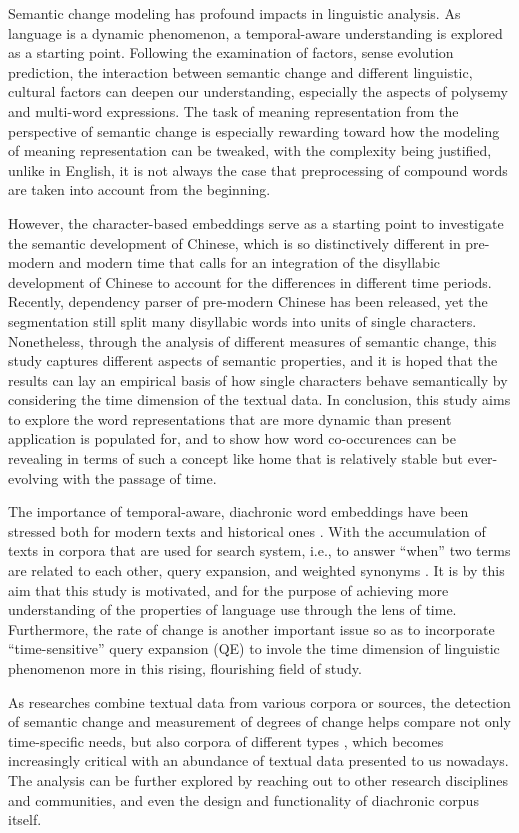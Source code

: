 Semantic change modeling has profound impacts in linguistic analysis. As language is a dynamic phenomenon, a temporal-aware understanding is explored as a starting point. Following the examination of factors, sense evolution prediction, the interaction between semantic change and different linguistic, cultural factors can deepen our understanding, especially the aspects of polysemy and multi-word expressions. The task of meaning representation from the perspective of semantic change is especially rewarding toward how the modeling of meaning representation can be tweaked, with the complexity being justified, unlike in English, it is not always the case that preprocessing of compound words are taken into account from the beginning.

However, the character-based embeddings serve as a starting point to investigate the semantic development of Chinese, which is so distinctively different in pre-modern and modern time that calls for an integration of the disyllabic development of Chinese to account for the differences in different time periods. Recently, dependency parser of pre-modern Chinese has been released, yet the segmentation still split many disyllabic words into units of single characters. Nonetheless, through the analysis of different measures of semantic change, this study captures different aspects of semantic properties, and it is hoped that the results can lay an empirical basis of how single characters behave semantically by considering the time dimension of the textual data. In conclusion, this study aims to explore the word representations that are more dynamic than present application is populated for, and to show how word co-occurences can be revealing in terms of such a concept like home that is relatively stable but ever-evolving with the passage of time.

The importance of temporal-aware, diachronic word embeddings have been stressed both for modern texts and historical ones \parencite{huang2019neural,rosin2017learning,ruder2017word}. With the accumulation of texts in corpora that are used for search system, i.e., to answer ``when'' two terms are related to each other, query expansion, and weighted synonyms \parencite{rosin2017learning}. It is by this aim that this study is motivated, and for the purpose of achieving more understanding of the properties of language use through the lens of time. Furthermore, the rate of change is another important issue so as to incorporate ``time-sensitive'' query expansion (QE) \parencite{rosin2017learning} to invole the time dimension of linguistic phenomenon more in this rising, flourishing field of study.

As researches combine textual data from various corpora or sources, the detection of semantic change and measurement of degrees of change helps compare not only time-specific needs, but also corpora of different types \parencite{schlechtweg2019wind}, which becomes increasingly critical with an abundance of textual data presented to us nowadays. The analysis can be further explored by reaching out to other research disciplines and communities, and even the design and functionality of diachronic corpus itself.
